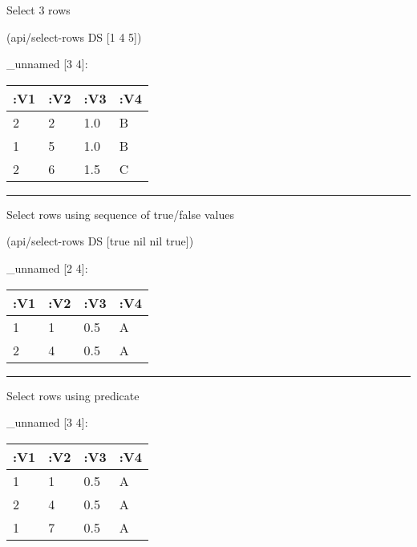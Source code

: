 \documentclass[]{article}
\newenvironment{Shaded}{\begin{snugshade}}{\end{snugshade}}
\newcommand{\AttributeTok}[1]{\textcolor[rgb]{0.77,0.63,0.00}{#1}}
\newcommand{\DecValTok}[1]{\textcolor[rgb]{0.00,0.00,0.81}{#1}}
\newcommand{\KeywordTok}[1]{\textcolor[rgb]{0.13,0.29,0.53}{\textbf{#1}}}
\newcommand{\NormalTok}[1]{#1}
\newcommand{\VariableTok}[1]{\textcolor[rgb]{0.00,0.00,0.00}{#1}}
\begin{document}
Select 3 rows

\begin{Shaded}
\begin{Highlighting}[]
\NormalTok{(api/select-rows DS [}\DecValTok{1} \DecValTok{4} \DecValTok{5}\NormalTok{])}
\end{Highlighting}
\end{Shaded}

\_unnamed {[}3 4{]}:

\begin{longtable}[]{@{}llll@{}}
\toprule
:V1 & :V2 & :V3 & :V4\tabularnewline
\midrule
\endhead
2 & 2 & 1.0 & B\tabularnewline
1 & 5 & 1.0 & B\tabularnewline
2 & 6 & 1.5 & C\tabularnewline
\bottomrule
\end{longtable}

\begin{center}\rule{0.5\linewidth}{0.5pt}\end{center}

Select rows using sequence of true/false values

\begin{Shaded}
\begin{Highlighting}[]
\NormalTok{(api/select-rows DS [}\VariableTok{true} \VariableTok{nil} \VariableTok{nil} \VariableTok{true}\NormalTok{])}
\end{Highlighting}
\end{Shaded}

\_unnamed {[}2 4{]}:

\begin{longtable}[]{@{}llll@{}}
\toprule
:V1 & :V2 & :V3 & :V4\tabularnewline
\midrule
\endhead
1 & 1 & 0.5 & A\tabularnewline
2 & 4 & 0.5 & A\tabularnewline
\bottomrule
\end{longtable}

\begin{center}\rule{0.5\linewidth}{0.5pt}\end{center}

Select rows using predicate

\begin{Shaded}
\end{Shaded}

\_unnamed {[}3 4{]}:

\begin{longtable}[]{@{}llll@{}}
\toprule
:V1 & :V2 & :V3 & :V4\tabularnewline
\midrule
\endhead
1 & 1 & 0.5 & A\tabularnewline
2 & 4 & 0.5 & A\tabularnewline
1 & 7 & 0.5 & A\tabularnewline
\bottomrule
\end{longtable}
\end{document}

